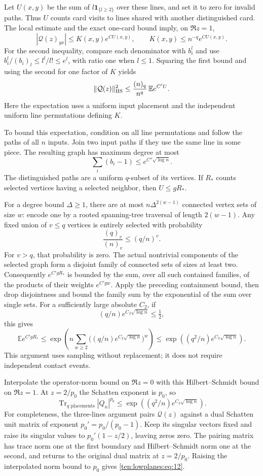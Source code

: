 Let $U(x,y)$ be the sum of $l\mathbf1_{\{l\ge2\}}$ over these lines, and set it to zero for invalid paths. Thus $U$ counts card visits to lines shared with another distinguished card. The local estimate and the exact one-card bound imply, on $\Re z=1$,
\[
 |\mathcal Q(z)_{yx}|\le K(x,y)e^{CU(x,y)},
 \qquad K(x,y)\le n^{-q}e^{CU(x,y)}.
\]
For the second inequality, compare each denominator with $b_i^l$ and use
$b_i^l/(b_i)_l\le l^l/l!\le e^l$, with ratio one when $l\le1$.
Squaring the first bound and using the second for one factor of $K$ yields
\[
 \|\mathcal Q(z)\|_{\rm HS}^2
 \le\frac{(n)_q}{n^q}\,\mathbb E e^{C'U}.
\]
Here the expectation uses a uniform input placement and the independent uniform line permutations defining $K$.

To bound this expectation, condition on all line permutations and follow the paths of all $n$ inputs. Join two input paths if they use the same line in some piece. The resulting graph has maximum degree at most
\[
 \sum_i(b_i-1)\le e^{C''\sqrt{\log n}}.
\]
The distinguished paths are a uniform $q$-subset of its vertices. If $R_*$ counts selected vertices having a selected neighbor, then $U\le gR_*$.

For a degree bound $\Delta\ge1$, there are at most $n\Delta^{2(w-1)}$ connected vertex sets of size $w$: encode one by a rooted spanning-tree traversal of length $2(w-1)$. Any fixed union of $v\le q$ vertices is entirely selected with probability
\[
 \frac{(q)_v}{(n)_v}\le(q/n)^v.
\]
For $v>q$, that probability is zero.
The actual nontrivial components of the selected graph form a disjoint family of connected sets of sizes at least two. Consequently $e^{C'gR_*}$ is bounded by the sum, over all such contained families, of the products of their weights $e^{C'g w}$. Apply the preceding containment bound, then drop disjointness and bound the family sum by the exponential of the sum over single sets. For a sufficiently large absolute $C_2$, if
\[
 (q/n)e^{C_2\sqrt{\log n}}\le\tfrac12,
\]
this gives
\[
 \mathbb E e^{C'gR_*}
 \le\exp\!\left(n\sum_{w\ge2}
       \big((q/n)e^{C_2\sqrt{\log n}}\big)^w\right)
 \le\exp\!\left((q^2/n)e^{C_3\sqrt{\log n}}\right).
\]
This argument uses sampling without replacement; it does not require independent contact events.

Interpolate the operator-norm bound on $\Re z=0$ with this Hilbert--Schmidt bound on $\Re z=1$. At $z=2/p_0$ the Schatten exponent is $p_0$, so
\begin{equation}
 \operatorname{Tr}_{q\text{ placements}}|Q_n|^{p_0}
 \le\exp\!\left((q^2/n)e^{C_3\sqrt{\log n}}\right).
 \label{ten:lowplanes:eq:12}
\end{equation}
For completeness, the three-lines argument pairs $\mathcal Q(z)$ against a dual Schatten unit matrix of exponent $p_0'=p_0/(p_0-1)$. Keep its singular vectors fixed and raise its singular values to $p_0'(1-z/2)$, leaving zeros zero. The pairing matrix has trace norm one at the first boundary and Hilbert--Schmidt norm one at the second, and returns to the original dual matrix at $z=2/p_0$. Raising the interpolated norm bound to $p_0$ gives \eqref{ten:lowplanes:eq:12}.


